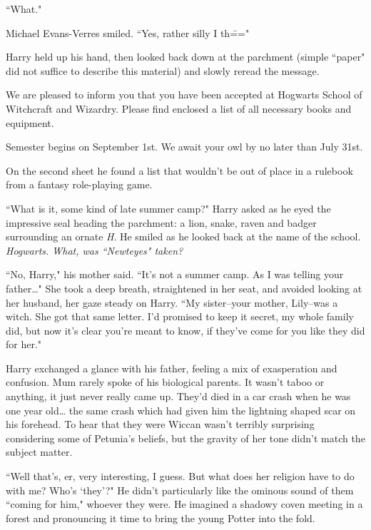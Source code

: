 ``What."

Michael Evans-Verres smiled. ``Yes, rather silly I th\==="

Harry held up his hand, then looked back down at the parchment (simple ``paper" did not suffice to describe this material) and slowly reread the message.

\begin{writtenNote}

We are pleased to inform you that you have been accepted at Hogwarts School of Witchcraft and Wizardry. Please find enclosed a list of all necessary books and equipment.

Semester begins on September 1st. We await your owl by no later than July 31st.


\end{writtenNote}

On the second sheet he found a list that wouldn't be out of place in a rulebook from a fantasy role-playing game.

``What is it, some kind of late summer camp?" Harry asked as he eyed the impressive seal heading the parchment: a lion, snake, raven and badger surrounding an ornate \emph{H}. He smiled as he looked back at the name of the school. \emph{Hogwarts. What, was ``Newteyes" taken?}

``No, Harry," his mother said. ``It's not a summer camp. As I was telling your father{\ldots}" She took a deep breath, straightened in her seat, and avoided looking at her husband, her gaze steady on Harry. ``My sister\---your mother, Lily\---was a witch. She got that same letter. I'd promised to keep it secret, my whole family did, but now it's clear you're meant to know, if they've come for you like they did for her."

Harry exchanged a glance with his father, feeling a mix of exasperation and confusion. Mum rarely spoke of his biological parents. It wasn't taboo or anything, it just never really came up. They'd died in a car crash when he was one year old{\ldots} the same crash which had given him the lightning shaped scar on his forehead. To hear that they were Wiccan wasn't terribly surprising considering some of Petunia's beliefs, but the gravity of her tone didn't match the subject matter.

``Well that's, er, very interesting, I guess. But what does her religion have to do with me? Who's `they'?" He didn't particularly like the ominous sound of them ``coming for him," whoever they were. He imagined a shadowy coven meeting in a forest and pronouncing it time to bring the young Potter into the fold.

